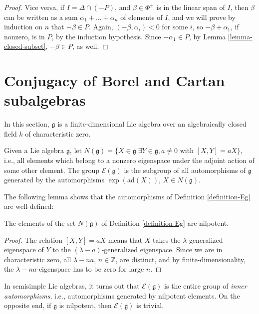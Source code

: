 \begin{proof}
 Vice versa, if $I= \Delta \cap (-P)$, and $\beta\in \Phi^+$ is in the linear span of $I$, then $\beta$ can be written as a sum $\alpha_1+\dots+\alpha_n$ of elements of $I$, and  we will prove by induction on $n$ that $-\beta\in P$. Again, $(-\beta,\alpha_i)<0$ for some $i$, so $-\beta+\alpha_1$, if nonzero, is in $P$, by the induction hypothesis. Since $-\alpha_1\in P$, by Lemma \ref{lemma-closed-subset}, $-\beta\in P$, as well.
\end{proof}




\section{Conjugacy of Borel and Cartan subalgebras}
\label{section-conjugacy-Borel-Cartan}

In this section, $\mathfrak g$ is a finite-dimensional Lie algebra over an algebraically closed field $k$ of characteristic zero.

\begin{definition}
 \label{definition-Eg}
Given a Lie algebra $\mathfrak g$, let $N(\mathfrak g)  = \{ X\in\mathfrak g| \exists Y\in \mathfrak g, a\ne 0 \mbox{ with } [X,Y] = a X\}$, i.e., all elements which belong to a nonzero eigenspace under the adjoint action of some other element. The group {\it $\mathcal E(\mathfrak g)$} is the subgroup of all automorphisms of $\mathfrak g$ generated by the automorphisms $\exp(\text{ad}(X))$, $X\in N(\mathfrak g)$. 
\end{definition}

The following lemma shows that the automorphisms of Definition \ref{definition-Eg} are well-defined:
\begin{lemma}
 \label{Eg-nilpotent}
 The elements of the set $N(\mathfrak g)$ of Definition \ref{definition-Eg} are nilpotent.
\end{lemma}

\begin{proof}
 The relation $[X,Y] = a X$ means that $X$ takes the $\lambda$-generalized eigenspace of $Y$ to the $(\lambda-a)$-generalized eigenspace. Since we are in characteristic zero, all $\lambda-na$, $n\in \mathbb Z$, are distinct, and by finite-dimensionality, the $\lambda-na$-eigenspace has to be zero for large $n$.
\end{proof}


\begin{remark}
 \label{remark-Eg}
In semisimple Lie algebras, it turns out that $\mathcal E(\mathfrak g)$ is the entire group of \emph{inner automorphisms}, i.e., automorphisms generated by nilpotent elements. On the opposite end, if $\mathfrak g$ is nilpotent, then $\mathcal E(\mathfrak g)$ is trivial.
\end{remark}

